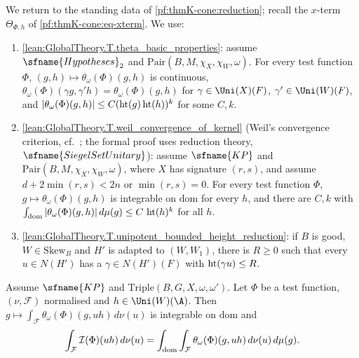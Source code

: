 We return to the standing data of \cref{pf:thmK-cone:reduction}; recall the $x$-term $\Theta_{\Phi,h}$ of
\eqref{pf:thmK-cone:eq-xterm}.  We use:
\begin{enumerate}[resume*=thmKconeD]
\item\label{pf:thmK-cone:D-basic} \cref{lean:GlobalTheory.T.theta_basic_properties}: assume $\sfname{Hypotheses}_2$ and
  $\mathrm{Pair}(B,M,\chi_X,\chi_W,\omega)$.  For every test function $\Phi$, $(g,h)\mapsto\theta_\omega(\Phi)(g,h)$ is
  continuous, $\theta_\omega(\Phi)(\gamma g,\gamma'h)=\theta_\omega(\Phi)(g,h)$ for $\gamma\in\Uni(X)(F)$,
  $\gamma'\in\Uni(W)(F)$, and $|\theta_\omega(\Phi)(g,h)|\le C(\operatorname{ht}(g)\operatorname{ht}(h))^k$ for some $C,k$.
\item\label{pf:thmK-cone:D-weil} \cref{lean:GlobalTheory.T.weil_convergence_of_kernel} (Weil's convergence criterion,
  cf.\ \cite{Weil1965}; the formal proof uses reduction theory, $\sfname{SiegelSetUnitary}$): assume $\sfname{KP}$ and
  $\mathrm{Pair}(B,M,\chi_X,\chi_W,\omega)$, where $X$ has signature $(r,s)$, and assume $d+2\min(r,s)<2n$ or
  $\min(r,s)=0$.  For every test function $\Phi$, $g\mapsto\theta_\omega(\Phi)(g,h)$ is integrable on $\mathrm{dom}$ for
  every $h$, and there are $C,k$ with $\int_{\mathrm{dom}}|\theta_\omega(\Phi)(g,h)|\,d\mu(g)\le C\,\operatorname{ht}(h)^k$ for
  all $h$.
\item\label{pf:thmK-cone:D-height} \cref{lean:GlobalTheory.T.unipotent_bounded_height_reduction}: if $B$ is good,
  $W\in\mathrm{Skew}_B$ and $H'$ is adapted to $(W,W_1)$, there is $R\ge0$ such that every $u\in N(H')$ has a
  $\gamma\in N(H')(F)$ with $\operatorname{ht}(\gamma u)\le R$.
\end{enumerate}

\begin{lemma}[Fubini]\label{pf:thmK-cone:fubini}
Assume $\sfname{KP}$ and $\mathrm{Triple}(B,G,X,\omega,\omega')$.  Let $\Phi$ be a test function, $(\nu,\mathcal F)$
normalised and $h\in\Uni(W)(\A)$.  Then $g\mapsto\int_{\mathcal F}\theta_\omega(\Phi)(g,uh)\,d\nu(u)$ is integrable on
$\mathrm{dom}$ and
\[
  \int_{\mathcal F}\mathcal{I}(\Phi)(uh)\,d\nu(u)=\int_{\mathrm{dom}}\int_{\mathcal F}\theta_\omega(\Phi)(g,uh)\,d\nu(u)\,d\mu(g).
\]
\end{lemma}


